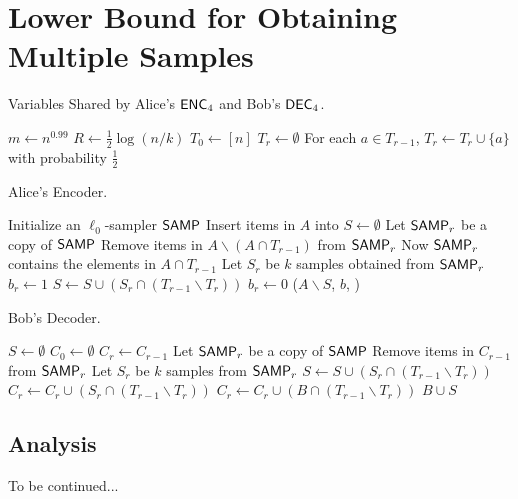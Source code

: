 \section{Lower Bound for Obtaining Multiple Samples}\label{sec:k-samples-lb}

\begin{algorithm}[H] 
  \caption{Variables Shared by Alice's $\textsf{ENC}_4$ and Bob's $\textsf{DEC}_4$.} \label{algo:para4}
  \begin{algorithmic}[1] 
    \State $m\leftarrow n^{0.99}$
    \State $R\leftarrow \frac{1}{2}\log (n/k)$
    \State $T_0\leftarrow [n]$
      \State $T_r\leftarrow \emptyset$
      \State For each $a\in T_{r-1}$, $T_r\leftarrow T_r\cup \{a\}$ with probability $\frac{1}{2}$
    \EndFor
  \end{algorithmic}
\end{algorithm}

\begin{algorithm}[H] 
  \caption{Alice's Encoder.} \label{algo:enc4}
  \begin{algorithmic}[1]
    \State Initialize an $\ell_0$-sampler $\textsf{SAMP}$
    \State Insert items in $A$ into \samp
    \State $S\leftarrow \emptyset$
    \State Let $\textsf{SAMP}_r$ be a copy of $\textsf{SAMP}$
    \State Remove items in $A\backslash (A\cap T_{r-1})$ from $\textsf{SAMP}_r$ \Comment Now $\textsf{SAMP}_r$ contains the elements in $A\cap T_{r-1}$
    \State Let $S_r$ be $k$ samples obtained from $\textsf{SAMP}_r$
     
      \State $b_r\leftarrow 1$ 
      \State $S\leftarrow S \cup (S_r\cap (T_{r-1}\backslash T_r))$
    \Else 
      \State $b_r\leftarrow 0$
    \EndIf
    \EndFor
      \State \Return ($A\backslash S$, $b$, \samp) 
    \EndProcedure
  \end{algorithmic}
\end{algorithm}

\begin{algorithm}[H] 
  \caption{Bob's Decoder.} \label{algo:dec4}
  \begin{algorithmic}[1]
    \State $S\leftarrow \emptyset$
    \State $C_0 \leftarrow \emptyset$
      \State $C_r\leftarrow C_{r-1}$
        \State Let $\textsf{SAMP}_r$ be a copy of $\textsf{SAMP}$
        \State Remove items in $C_{r-1}$ from $\textsf{SAMP}_r$ 
        \State Let $S_r$ be $k$ samples from $\textsf{SAMP}_r$
        \State $S\leftarrow S \cup (S_r\cap (T_{r-1}\backslash T_r))$
        \State $C_r\leftarrow C_r \cup (S_r\cap (T_{r-1}\backslash T_r))$
      \EndIf
      \State $C_r\leftarrow C_r \cup (B\cap (T_{r-1}\backslash T_r))$
    \EndFor
    \State \Return $B\cup S$ 
    \EndProcedure
  \end{algorithmic}
\end{algorithm}

\subsection{Analysis}

To be continued...
